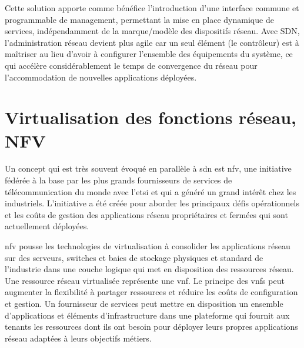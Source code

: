 
Cette solution apporte comme bénéfice l'introduction d'une interface commune et programmable de management, permettant la mise en place dynamique de services, indépendamment de la marque/modèle des dispositifs réseau. Avec SDN, l'administration réseau devient plus agile car un seul élément (le contrôleur) est à maîtriser au lieu d'avoir à configurer l'ensemble des équipements du système, ce qui accélère considérablement le temps de convergence du réseau pour l'accommodation de nouvelles applications déployées. \cite{SDNNewNormONFExecutiveSummary} \cite{ImplementationChallengesForSDNBackground}





\section{Virtualisation des fonctions réseau, NFV}


Un concept qui est très souvent évoqué en parallèle à \gls{sdn} est \gls{nfv}, une initiative fédérée à la base par les plus grands fournisseurs de services  de télécommunication du monde avec l'\gls{etsi} et qui a généré un grand intérêt chez les industriels. L'initiative a été créée pour aborder les principaux défis opérationnels et les coûts de gestion des applications réseau propriétaires et fermées qui sont actuellement déployées.


\gls{nfv} pousse les technologies de virtualisation à consolider les applications réseau sur des serveurs, switches et baies de stockage physiques et standard de l'industrie dans une couche logique qui met en disposition des ressources réseau. Une ressource réseau virtualisée représente une \gls{vnf}. Le principe des \glspl{vnf} peut augmenter la flexibilité à partager ressources et réduire les coûts de configuration et gestion. Un fournisseur de services peut mettre en disposition un ensemble d'applications et éléments d'infrastructure dans une plateforme qui fournit aux tenants les ressources dont ils ont besoin pour déployer leurs propres applications réseau adaptées à leurs objectifs métiers.



